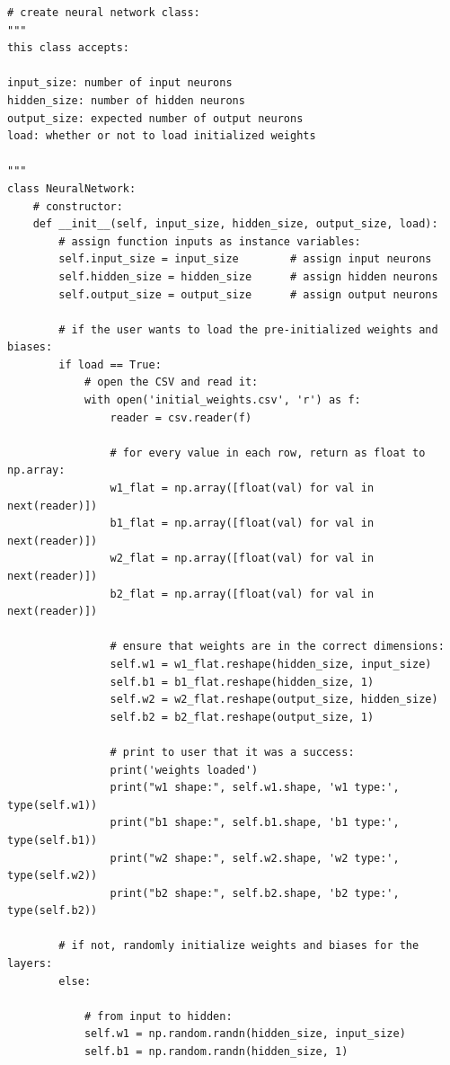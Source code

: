 \documentclass[a4paper]{article}
\begin{document}
\begin{lstlisting}[basicstyle= \scriptsize]
# create neural network class:
"""
this class accepts:

input_size: number of input neurons
hidden_size: number of hidden neurons
output_size: expected number of output neurons
load: whether or not to load initialized weights

"""
class NeuralNetwork:
    # constructor:
    def __init__(self, input_size, hidden_size, output_size, load):
        # assign function inputs as instance variables:
        self.input_size = input_size        # assign input neurons
        self.hidden_size = hidden_size      # assign hidden neurons
        self.output_size = output_size      # assign output neurons

        # if the user wants to load the pre-initialized weights and biases:
        if load == True:
            # open the CSV and read it:
            with open('initial_weights.csv', 'r') as f:
                reader = csv.reader(f)

                # for every value in each row, return as float to np.array:
                w1_flat = np.array([float(val) for val in next(reader)])
                b1_flat = np.array([float(val) for val in next(reader)])
                w2_flat = np.array([float(val) for val in next(reader)])
                b2_flat = np.array([float(val) for val in next(reader)])

                # ensure that weights are in the correct dimensions:
                self.w1 = w1_flat.reshape(hidden_size, input_size)
                self.b1 = b1_flat.reshape(hidden_size, 1)
                self.w2 = w2_flat.reshape(output_size, hidden_size)
                self.b2 = b2_flat.reshape(output_size, 1)

                # print to user that it was a success:
                print('weights loaded')
                print("w1 shape:", self.w1.shape, 'w1 type:', type(self.w1))
                print("b1 shape:", self.b1.shape, 'b1 type:', type(self.b1))
                print("w2 shape:", self.w2.shape, 'w2 type:', type(self.w2))
                print("b2 shape:", self.b2.shape, 'b2 type:', type(self.b2))

        # if not, randomly initialize weights and biases for the layers:
        else:

            # from input to hidden:
            self.w1 = np.random.randn(hidden_size, input_size)
            self.b1 = np.random.randn(hidden_size, 1)


\end{lstlisting}
\end{document}
